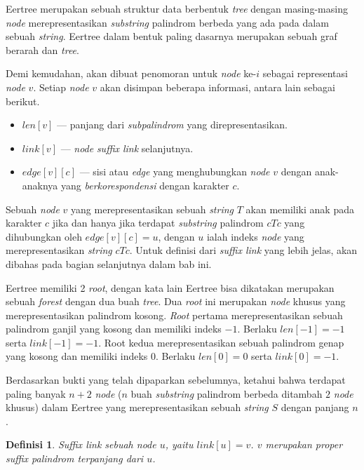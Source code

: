 \documentclass[11pt, a4paper, final]{article}
\newtheorem{definition}[theorem]{Definisi}
\begin{document}
Eertree merupakan sebuah struktur data berbentuk \textit{tree} dengan masing-masing \textit{node} merepresentasikan \textit{substring} palindrom berbeda yang ada pada dalam sebuah \textit{string}. Eertree dalam bentuk paling dasarnya merupakan sebuah graf berarah dan \textit{tree}.

Demi kemudahan, akan dibuat penomoran untuk \textit{node} ke-$i$ sebagai representasi \textit{node} $v$. Setiap \textit{node} $v$ akan disimpan beberapa informasi, antara lain sebagai berikut.

\begin{itemize}[noitemsep]
    \item $len[v]$ --- panjang dari \textit{subpalindrom} yang direpresentasikan.
    \item $link[v]$ --- \textit{node} \textit{suffix link} selanjutnya.
    \item $edge[v][c]$ --- sisi atau \textit{edge} yang menghubungkan \textit{node} $v$ dengan anak-anaknya yang \textit{berkorespondensi} dengan karakter $c$.
\end{itemize}

Sebuah \textit{node} $v$ yang merepresentasikan sebuah \textit{string} $T$ akan memiliki anak pada karakter $c$ jika dan hanya jika terdapat \textit{substring} palindrom $cTc$ yang dihubungkan oleh $edge[v][c] = u$, dengan $u$ ialah indeks \textit{node} yang merepresentasikan \textit{string} $cTc$. Untuk definisi dari \textit{suffix link} yang lebih jelas, akan dibahas pada bagian selanjutnya dalam bab ini.

Eertree memiliki 2 \textit{root}, dengan kata lain Eertree bisa dikatakan merupakan sebuah \textit{forest} dengan dua buah \textit{tree}. Dua \textit{root} ini merupakan \textit{node} khusus yang merepresentasikan palindrom kosong. \textit{Root} pertama merepresentasikan sebuah palindrom ganjil yang kosong dan memiliki indeks $-1$. Berlaku $len[-1] = -1$ serta $link[-1] = -1$. Root kedua merepresentasikan sebuah palindrom genap yang kosong dan memiliki indeks $0$. Berlaku $len[0] = 0$ serta $link[0] = -1$.

Berdasarkan bukti yang telah dipaparkan sebelumnya, ketahui bahwa terdapat paling banyak $n + 2$ \textit{node} ($n$ buah \textit{substring} palindrom berbeda ditambah $2$ \textit{node} khusus) dalam Eertree yang merepresentasikan sebuah \textit{string} $S$ dengan panjang $n$.

\begin{definition}
\textit{Suffix link} sebuah \textit{node} $u$, yaitu $link[u] = v$. $v$ merupakan proper suffix palindrom terpanjang dari $u$.
\end{definition}
\end{document}
